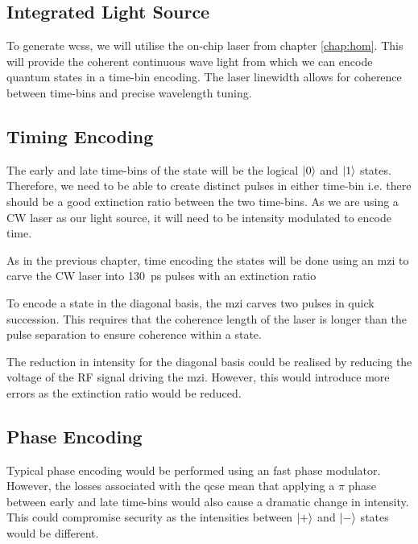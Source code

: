 \subsection{Integrated Light Source}

To generate \acp{wcs}, we will utilise the on-chip laser from chapter \ref{chap:hom}. This will provide the coherent continuous wave light from which we can encode quantum states in a time-bin encoding. The laser linewidth allows for coherence between time-bins and precise wavelength tuning.  

\subsection{Timing Encoding}

The early and late time-bins of the state will be the logical $\ket{0}$ and $\ket{1}$ states. Therefore, we need to be able to create distinct pulses in either time-bin i.e. there should be a good extinction ratio between the two time-bins. As we are using a \ac{CW} laser as our light source, it will need to be intensity modulated to encode time.

As in the previous chapter, time encoding the states will be done using an \acl{mzi} to carve the \ac{CW} laser into \SI{130}{ps} pulses with an extinction ratio


To encode a state in the diagonal basis, the \ac{mzi} carves two pulses in quick succession. This requires that the coherence length of the laser is longer than the pulse separation to ensure coherence within a state. 

The reduction in intensity for the diagonal basis could be realised by reducing the voltage of the RF signal driving the \ac{mzi}. However, this would introduce more errors as the extinction ratio would be reduced.

\subsection{Phase Encoding}

Typical phase encoding would be performed using an fast phase modulator. However, the losses associated with the \ac{qcse} mean that applying a $\pi$ phase between early and late time-bins would also cause a dramatic change in intensity. This could compromise security as the intensities between $\ket{+}$ and $\ket{-}$ states would be different. 

